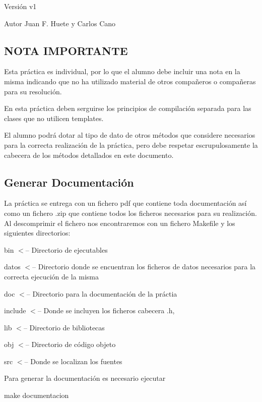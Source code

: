 \begin{DoxyVersion}{Versión}
v1 
\end{DoxyVersion}
\begin{DoxyAuthor}{Autor}
Juan F. Huete y Carlos Cano
\end{DoxyAuthor}
\hypertarget{index_NOTA}{}\subsection{N\+O\+T\+A I\+M\+P\+O\+R\+T\+A\+N\+TE}\label{index_NOTA}
Esta práctica es individual, por lo que el alumno debe incluir una nota en la misma indicando que no ha utilizado material de otros compañeros o compañeras para su resolución.

En esta práctica deben serguirse los principios de compilación separada para las clases que no utilicen templates.

El alumno podrá dotar al tipo de dato de otros métodos que considere necesarios para la correcta realización de la práctica, pero debe respetar escrupulosamente la cabecera de los métodos detallados en este documento.\hypertarget{index_generar}{}\subsection{Generar Documentación}\label{index_generar}
La práctica se entrega con un fichero pdf que contiene toda documentación así como un fichero .zip que contiene todos los ficheros necesarios para su realización. Al descomprimir el fichero nos encontraremos con un fichero Makefile y los siguientes directorios\+:

\begin{DoxyItemize}
\item bin $<$-- Directorio de ejecutables \item datos $<$-- Directorio donde se encuentran los ficheros de datos necesarios para la correcta ejecución de la misma \item doc $<$-- Directorio para la documentación de la práctia \item include $<$-- Donde se incluyen los ficheros cabecera .h, \item lib $<$-- Directorio de bibliotecas \item obj $<$-- Directorio de código objeto \item src $<$-- Donde se localizan los fuentes\end{DoxyItemize}
Para generar la documentación es necesario ejecutar 
\begin{DoxyCode}
make documentacion
\end{DoxyCode}


